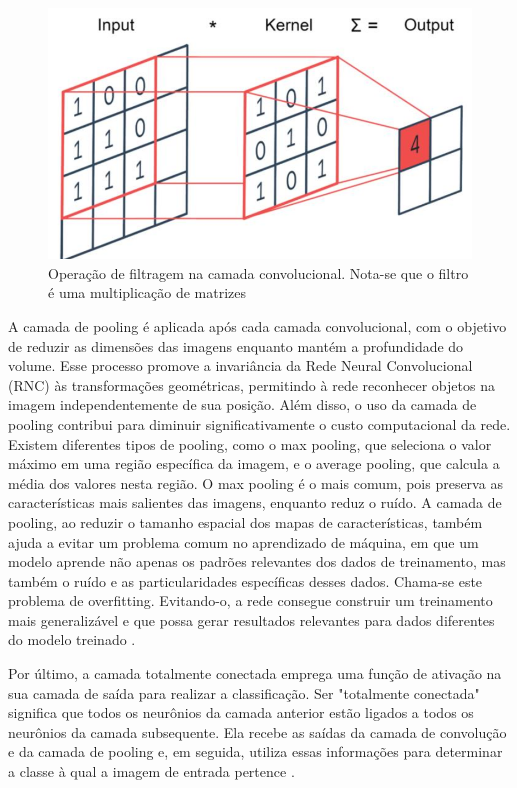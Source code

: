 \begin{figure}[!h]
    \center
    \begin{minipage}{0.9\linewidth}
    \center
    \captionsetup{justification=centering,margin=0.5cm,font=small}
    \includegraphics[width=0.7\linewidth]{img/cap2/filtro.png}
    \caption{ Operação de filtragem na camada convolucional. Nota-se que o filtro é uma multiplicação de matrizes \cite{shorthistory}} 
    \label{fig:kernel}
    \end{minipage}
\end{figure}

A camada de pooling é aplicada após cada camada convolucional, com o objetivo de reduzir as dimensões das imagens enquanto mantém a profundidade do volume. Esse processo promove a invariância da Rede Neural Convolucional (RNC) às transformações geométricas, permitindo à rede reconhecer objetos na imagem independentemente de sua posição. Além disso, o uso da camada de pooling contribui para diminuir significativamente o custo computacional da rede. Existem diferentes tipos de pooling, como o max pooling, que seleciona o valor máximo em uma região específica da imagem, e o average pooling, que calcula a média dos valores nesta região. O max pooling é o mais comum, pois preserva as características mais salientes das imagens, enquanto reduz o ruído. A camada de pooling, ao reduzir o tamanho espacial dos mapas de características, também ajuda a evitar um problema comum no aprendizado de máquina, em que um modelo aprende não apenas os padrões relevantes dos dados de treinamento, mas também o ruído e as particularidades específicas desses dados. Chama-se este problema de overfitting. Evitando-o, a rede consegue construir um treinamento mais generalizável e que possa gerar resultados relevantes para dados diferentes do modelo treinado \cite{lima2020captcha}.

Por último, a camada totalmente conectada emprega uma função de ativação na sua camada de saída para realizar a classificação. Ser "totalmente conectada" significa que todos os neurônios da camada anterior estão ligados a todos os neurônios da camada subsequente. Ela recebe as saídas da camada de convolução e da camada de pooling e, em seguida, utiliza essas informações para determinar a classe à qual a imagem de entrada pertence \cite{silva2018estudo}.


